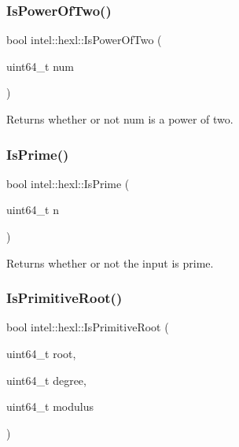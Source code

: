 \mbox{\label{namespaceintel_1_1hexl_ada0fe74afb4384b54728cba8ec3f69cd}} 
\subsubsection{\texorpdfstring{Is\+Power\+Of\+Two()}{IsPowerOfTwo()}}
{\footnotesize\ttfamily bool intel\+::hexl\+::\+Is\+Power\+Of\+Two (\begin{DoxyParamCaption}\item[{uint64\+\_\+t}]{num }\end{DoxyParamCaption})\hspace{0.3cm}{\ttfamily [inline]}}



Returns whether or not num is a power of two. 

\mbox{\label{namespaceintel_1_1hexl_a1155b31afc84bd8a7080d49b66480395}} 
\subsubsection{\texorpdfstring{Is\+Prime()}{IsPrime()}}
{\footnotesize\ttfamily bool intel\+::hexl\+::\+Is\+Prime (\begin{DoxyParamCaption}\item[{uint64\+\_\+t}]{n }\end{DoxyParamCaption})}



Returns whether or not the input is prime. 

\mbox{\label{namespaceintel_1_1hexl_a8b04aa9aed381d3c976d953efbe0a4b6}} 
\subsubsection{\texorpdfstring{Is\+Primitive\+Root()}{IsPrimitiveRoot()}}
{\footnotesize\ttfamily bool intel\+::hexl\+::\+Is\+Primitive\+Root (\begin{DoxyParamCaption}\item[{uint64\+\_\+t}]{root,  }\item[{uint64\+\_\+t}]{degree,  }\item[{uint64\+\_\+t}]{modulus }\end{DoxyParamCaption})}



